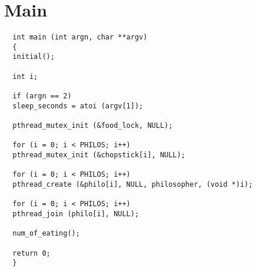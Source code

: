 \documentclass{report}
\numberwithin{figure}{section}
\begin{document}
\section*{Main}

\begin{lstlisting}
  int main (int argn, char **argv)
  {
  initial();
  
  int i;
  
  if (argn == 2)
  sleep_seconds = atoi (argv[1]);
  
  pthread_mutex_init (&food_lock, NULL);
  
  for (i = 0; i < PHILOS; i++)
  pthread_mutex_init (&chopstick[i], NULL);
  
  for (i = 0; i < PHILOS; i++)
  pthread_create (&philo[i], NULL, philosopher, (void *)i);
  
  for (i = 0; i < PHILOS; i++)
  pthread_join (philo[i], NULL);
  
  num_of_eating();
  
  return 0;
  }
\end{lstlisting}
\newpage
\end{document}
